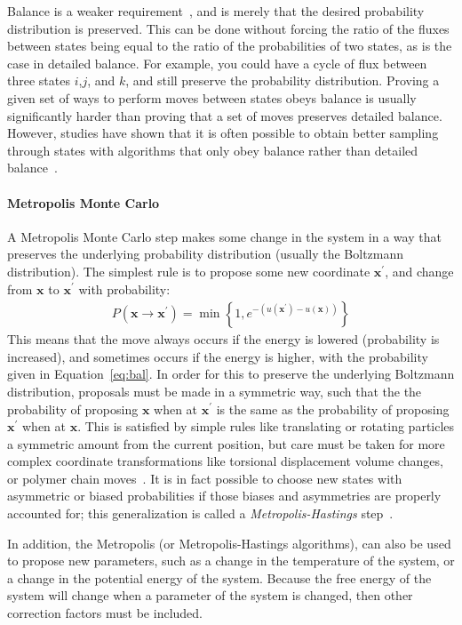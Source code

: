 \documentclass[9pt,review]{livecoms}
\newcommand{\vx}{\mathbf{x}}
\begin{document}
Balance is a weaker requirement~\cite{deem:jcp:1999:balance}, and is merely that the desired probability distribution is preserved. This can be done without forcing the ratio of the fluxes between states being equal to the ratio of the probabilities of two states, as is the case in detailed balance.  For example, you could have a cycle of flux between three states $i$,$j$, and $k$, and still preserve the probability distribution.  Proving a given set of ways to perform moves between states obeys balance is usually significantly harder than proving that a set of moves preserves detailed balance.
However, studies have shown that it is often possible to obtain better sampling through states with algorithms that only obey balance rather than detailed balance~\citep{deem:jcp:1999:balance,Faizi:JCTC:2020}.

\hypertarget{ref:MetropolisMonteCarlo} {\paragraph{Metropolis Monte Carlo}}
A Metropolis Monte Carlo step makes some change in the system in a way that preserves the underlying probability distribution (usually the Boltzmann distribution).  The simplest rule is to propose some new coordinate $\vx^\prime$, and change from $\vx$ to $\vx^\prime$ with probability:
\begin{eqnarray}
P(\vx\rightarrow \vx^\prime) = \min\left\{1, e^{-(u(\vx^\prime)-u(\vx))}\right\}
\label{eq:bal}
\end{eqnarray}
This means that the move always occurs if the energy is lowered (probability is increased), and sometimes occurs if the energy is higher, with the probability given in Equation~\ref{eq:bal}.
In order for this to preserve the underlying Boltzmann distribution, proposals must be made in a symmetric way, such that the the probability of proposing $\vx$ when at $\vx^\prime$ is the same as the probability of proposing $\vx^\prime$ when at $\vx$. This is satisfied by simple rules like translating or rotating particles a symmetric amount from the current position, but care must be taken for more complex coordinate transformations like torsional displacement volume changes, or polymer chain moves~\cite{Siepmann_mp_1992}.  It is in fact possible to choose new states with asymmetric or biased probabilities if those biases and asymmetries are properly accounted for; this generalization is called a \emph{Metropolis-Hastings} step~\cite{Hastings_biometrika_1970}.

In addition, the Metropolis (or Metropolis-Hastings algorithms), can also be used to propose new parameters, such as a change in the temperature of the system, or a change in the potential energy of the system. Because the free energy of the system will change when a parameter of the system is changed, then other correction factors must be included.
\end{document}
